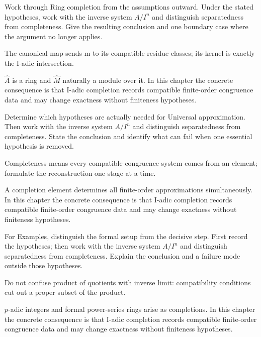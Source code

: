 \begin{exercise}\label{exr:v18-05}
Work through Ring completion from the assumptions outward. Under the stated hypotheses, work with the inverse system \(A/I^n\) and distinguish separatedness from completeness. Give the resulting conclusion and one boundary case where the argument no longer applies.
\end{exercise}
\begin{hint}
The canonical map sends m to its compatible residue classes; its kernel is exactly the I-adic intersection.
\end{hint}
\begin{solution}
$\widehat A$ is a ring and $\widehat M$ naturally a module over it. In this chapter the concrete consequence is that I-adic completion records compatible finite-order congruence data and may change exactness without finiteness hypotheses.
\end{solution}

\begin{exercise}\label{exr:v18-06}
Determine which hypotheses are actually needed for Universal approximation. Then work with the inverse system \(A/I^n\) and distinguish separatedness from completeness. State the conclusion and identify what can fail when one essential hypothesis is removed.
\end{exercise}
\begin{hint}
Completeness means every compatible congruence system comes from an element; formulate the reconstruction one stage at a time.
\end{hint}
\begin{solution}
A completion element determines all finite-order approximations simultaneously. In this chapter the concrete consequence is that I-adic completion records compatible finite-order congruence data and may change exactness without finiteness hypotheses.
\end{solution}

\begin{exercise}\label{exr:v18-07}
For Examples, distinguish the formal setup from the decisive step. First record the hypotheses; then work with the inverse system \(A/I^n\) and distinguish separatedness from completeness. Explain the conclusion and a failure mode outside those hypotheses.
\end{exercise}
\begin{hint}
Do not confuse product of quotients with inverse limit: compatibility conditions cut out a proper subset of the product.
\end{hint}
\begin{solution}
$p$-adic integers and formal power-series rings arise as completions. In this chapter the concrete consequence is that I-adic completion records compatible finite-order congruence data and may change exactness without finiteness hypotheses.
\end{solution}

